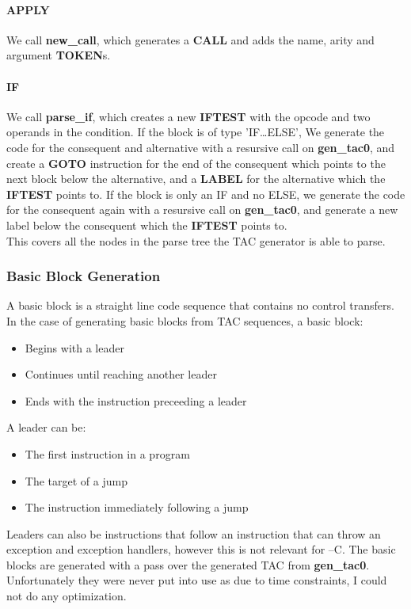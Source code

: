 \documentclass[12pt]{article}
\begin{document}
\paragraph{APPLY} We call \textbf{new\_call}, which generates a \textbf{CALL} and adds the name, arity and argument \textbf{TOKEN}s. 
\paragraph{IF} We call \textbf{parse\_if}, which creates a new \textbf{IFTEST} with the opcode and two operands in the condition. If the block is of type 'IF\dots ELSE', We generate the code for the consequent and alternative with a resursive call on \textbf{gen\_tac0}, and create a \textbf{GOTO} instruction for the end of the consequent which points to the next block below the alternative, and a \textbf{LABEL} for the alternative which the \textbf{IFTEST} points to. If the block is only an IF and no ELSE, we generate the code for the consequent again with a resursive call on \textbf{gen\_tac0}, and generate a new label below the consequent which the \textbf{IFTEST} points to. 
\\\newline This covers all the nodes in the parse tree the TAC generator is able to parse. 
\subsubsection{Basic Block Generation}
A basic block is a straight line code sequence that contains no control transfers\supercite{cooper2011engineering}. In the case of generating basic blocks from TAC sequences, a basic block: 
\begin{itemize}
  \item Begins with a leader
  \item Continues until reaching another leader
  \item Ends with the instruction preceeding a leader
\end{itemize}
A leader can be: 
\begin{itemize}
  \item The first instruction in a program 
  \item The target of a jump
  \item The instruction immediately following a jump 
\end{itemize}
Leaders can also be instructions that follow an instruction that can throw an exception and exception handlers\supercite{aho1986compilers}, however this is not relevant for --C.
The basic blocks are generated with a pass over the generated TAC from \textbf{gen\_tac0}. Unfortunately they were never put into use as due to time constraints, I could not do any optimization. 
\end{document}
